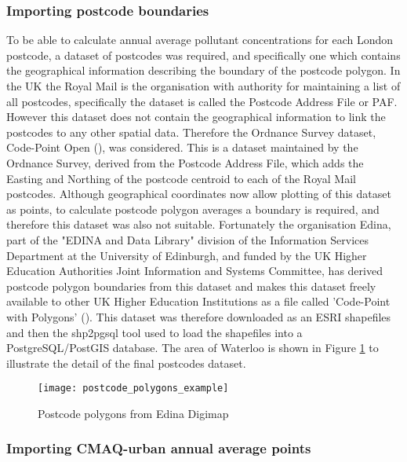        \subsubsection{Importing postcode boundaries}
        \label{sec:import_postcode_boundaries}

To be able to calculate annual average pollutant concentrations for each London postcode, a dataset of postcodes was required, and specifically one which contains the geographical information describing the boundary of the postcode polygon. In the UK the Royal Mail is the organisation with authority for maintaining a list of all postcodes, specifically the dataset is called the Postcode Address File or PAF. However this dataset does not contain the geographical information to link the postcodes to any other spatial data. Therefore the Ordnance Survey dataset, Code-Point Open (\cite{OrdnanceSurvey2015a}), was considered. This is a dataset maintained by the Ordnance Survey, derived from the Postcode Address File, which adds the Easting and Northing of the postcode centroid to each of the Royal Mail postcodes. Although geographical coordinates now allow plotting of this dataset as points, to calculate postcode polygon averages a boundary is required, and therefore this dataset was also not suitable. Fortunately the organisation Edina, part of the "EDINA and Data Library" division of the Information Services Department at the University of Edinburgh, and funded by the UK Higher Education Authorities Joint Information and Systems Committee, has derived postcode polygon boundaries from this dataset and makes this dataset freely available to other UK Higher Education Institutions as a file called 'Code-Point with Polygons' (\cite{OrdnanceSurvey2015}). This dataset was therefore downloaded as an ESRI shapefiles and then the shp2pgsql tool used to load the shapefiles into a PostgreSQL/PostGIS database. The area of Waterloo is shown in Figure \ref{fig:postcode_polygons_example} to illustrate the detail of the final postcodes dataset.

\begin{figure}[H]
\centering
\texttt{[image: postcode\_polygons\_example]}
\caption{Postcode polygons from Edina Digimap}
\label{fig:postcode_polygons_example}
\end{figure}

        \subsubsection{Importing CMAQ-urban annual average points}
        \label{importing_cmaq_annual_averages}

